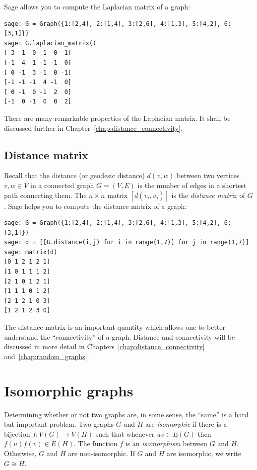 Sage allows you to compute the Laplacian matrix of a graph:
\begin{lstlisting}
sage: G = Graph({1:[2,4], 2:[1,4], 3:[2,6], 4:[1,3], 5:[4,2], 6:[3,1]})
sage: G.laplacian_matrix()
[ 3 -1  0 -1  0 -1]
[-1  4 -1 -1 -1  0]
[ 0 -1  3 -1  0 -1]
[-1 -1 -1  4 -1  0]
[ 0 -1  0 -1  2  0]
[-1  0 -1  0  0  2]
\end{lstlisting}
There are many remarkable properties of the Laplacian matrix. It shall
be discussed further in Chapter~\ref{chap:distance_connectivity}.



\subsection{Distance matrix}
\label{sec:introduction:distance_matrix}

Recall that the distance (or geodesic distance) $d(v,w)$ between two
vertices $v,w \in V$ in a connected graph $G = (V,E)$ is the number of
edges in a shortest path connecting them. The $n \times n$ matrix
$[d(v_i, v_j)]$ is the \emph{distance matrix}
of $G$. Sage helps you to compute the distance matrix of a graph:
\begin{lstlisting}
sage: G = Graph({1:[2,4], 2:[1,4], 3:[2,6], 4:[1,3], 5:[4,2], 6:[3,1]})
sage: d = [[G.distance(i,j) for i in range(1,7)] for j in range(1,7)]
sage: matrix(d)
[0 1 2 1 2 1]
[1 0 1 1 1 2]
[2 1 0 1 2 1]
[1 1 1 0 1 2]
[2 1 2 1 0 3]
[1 2 1 2 3 0]
\end{lstlisting}

The distance matrix is an important quantity which allows one to
better understand the ``connectivity'' of a graph. Distance and
connectivity will be discussed in more detail in
Chapters~\ref{chap:distance_connectivity}
and~\ref{chap:random_graphs}.



\section{Isomorphic graphs}
\label{chap:introduction:isomorphic_graphs}

Determining whether or not two graphs are, in some sense, the ``same''
is a hard but important problem. Two graphs $G$ and $H$ are
\emph{isomorphic} if there is a bijection
$f: V(G) \to V(H)$ such that whenever $uv \in E(G)$ then
$f(u) f(v) \in E(H)$. The function $f$ is an
\emph{isomorphism} between $G$ and
$H$. Otherwise, $G$ and $H$ are non-isomorphic. If $G$ and $H$ are
isomorphic, we write $G \cong H$\index{$\cong$}.

